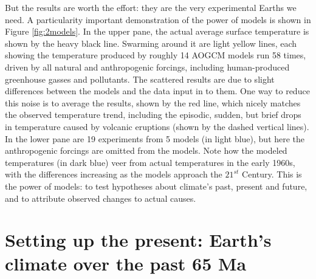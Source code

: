 But the results are worth the effort: they are the very experimental Earths we need. A particularity important demonstration of the power of models is shown in Figure \ref{fig:2models}. In the upper pane, the actual average surface temperature is shown by the heavy black line. Swarming around it are light yellow lines, each showing the temperature produced by roughly 14 AOGCM models run 58 times, driven by all natural and anthropogenic forcings, including human-produced greenhouse gasses and pollutants. The scattered results are due to slight differences between the models and the data input in to them. One way to reduce this noise is to average the results, shown by the red line, which nicely matches the observed temperature trend, including the episodic, sudden, but brief drops in temperature caused by volcanic eruptions (shown by the dashed vertical lines). In the lower pane are 19 experiments from 5 models (in light blue), but here the anthropogenic forcings are omitted from the models. Note how the modeled temperatures (in dark blue) veer from actual temperatures in the early 1960s, with the differences increasing as the models approach the $21^{st}$ Century. This is the power of models: to test hypotheses about climate's past, present and future, and to attribute observed changes to actual causes.        

\section{Setting up the present: Earth's climate over the past 65 Ma}

